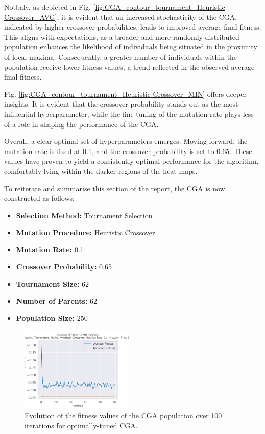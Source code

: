 \documentclass[10pt]{article}
\begin{document}
\begin{multicols}{2}
Notbaly, as depicted in Fig. \ref{fig:CGA_contour_tournament_Heuristic Crossover_AVG}, it is evident that an increased stochasticity of the CGA, indicated by higher crossover probabilities, leads to improved average final fitness. This aligns with expectations, as a broader and more randomly distributed population enhances the likelihood of individuals being situated in the proximity of local maxima. Consequently, a greater number of individuals within the population receive lower fitness values, a trend reflected in the observed average final fitness.

Fig. \ref{fig:CGA_contour_tournament_Heuristic Crossover_MIN} offers deeper insights. It is evident that the crossover probability stands out as the most influential hyperparameter, while the fine-tuning of the mutation rate plays less of a role in shaping the performance of the CGA. 

Overall, a clear optimal set of hyperparameters emerges. Moving forward, the mutation rate is fixed at 0.1, and the crossover probability is set to 0.65. These values have proven to yield a consistently optimal performance for the algorithm, comfortably lying within the darker regions of the heat maps.

To reiterate and summarise this section of the report, the CGA is now constructed as follows:
\begin{itemize}
    \item \textbf{Selection Method:} Tournament Selection
    \item \textbf{Mutation Procedure:} Heuristic Crossover
    \item \textbf{Mutation Rate:} 0.1
    \item \textbf{Crossover Probability:} 0.65
    \item \textbf{Tournament Size:} 62
    \item \textbf{Number of Parents:} 62
    \item \textbf{Population Size:} 250
\end{itemize}

\begin{figure}[H]
    \centering
    \includegraphics[width=0.48\textwidth]{../figures/Ungenerated Images/0.1_0.65_Fitness.png}
    \captionsetup{justification=centering}
    \caption{Evolution of the fitness values of the CGA population over 100 iterations for optimally-tuned CGA.}
    \label{fig:CGA_fitness_evo_OPT}
\end{figure}


\end{multicols}
\end{document}
